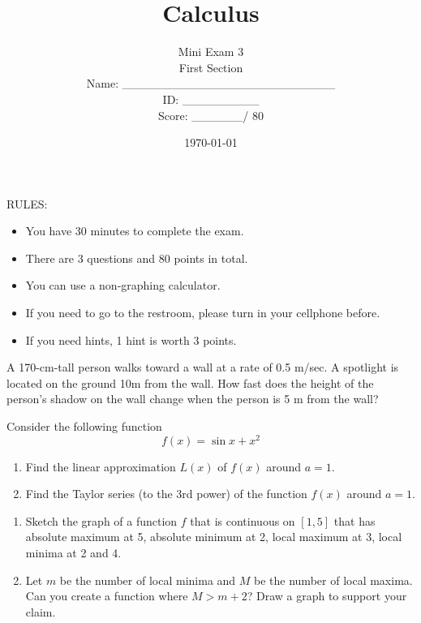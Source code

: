 \documentclass[12pt]{amsart}
\title{ Calculus }
\author{  Mini Exam 3 \\ First Section \\ \vspace{1cm} Name: \_\_\_\_\_\_\_\_\_\_\_\_\_\_\_\_\_\_\_\_\_\_\_\_\_  
\\ \vspace{1cm} ID: \_\_\_\_\_\_\_\_\_ \\ \vspace{1cm} Score: \_\_\_\_\_\_/ 80}
\date{\today}
\begin{document}
\maketitle


RULES:
\begin{itemize}
	\item You have 30 minutes to complete the exam.
	\item There are 3 questions and 80 points in total.
	\item You can use a non-graphing calculator.
	\item If you need to go to the restroom, please turn in your cellphone before.
	\item If you need hints, 1 hint is worth 3 points.
\end{itemize}

\newpage

\begin{problem}[20 points]
A 170-cm-tall person walks toward a wall at a rate of  0.5 m/sec.
A spotlight is located on the ground 10m from the wall.
How fast does the height of the person’s shadow on the wall change when the person is 5 m from the wall?
\end{problem}

\newpage

\begin{problem}[20 points]
Consider the following function
$$ f(x) = \sin x + x^2 $$
\begin{enumerate}
	\item Find the linear approximation $L(x)$ of $f(x)$ around $a = 1$.
	      \vspace{8cm}
	\item Find the Taylor series (to the 3rd power) of the function $f(x)$ around $a = 1$.
	      \vspace{8cm}
\end{enumerate}
\end{problem}

\newpage

\begin{problem}[20 points]
\begin{enumerate}
	\item Sketch the graph of a function $f$ that is continuous on $[1,5]$ that has absolute maximum at 5, absolute minimum at 2,   local maximum at 3, local minima at 2 and 4.
	      \vspace{8cm}
	\item Let $m$ be the number of local minima and  $M$ be the number of local maxima.
	      Can you create a function where  $M > m+ 2$? Draw a graph to support your claim.
\end{enumerate}
\end{problem}
\end{document}
